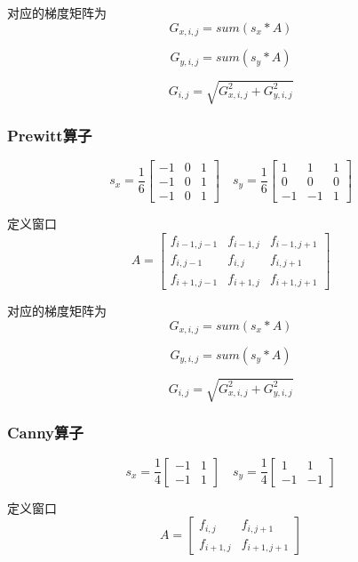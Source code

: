 \documentclass{article}
\begin{document}
对应的梯度矩阵为
\[
G_{x, i,j} = sum\left( s_x * A \right)
\]

\[G_{y, i,j} = sum\left( s_y * A \right)
\]

\[G_{i,j} = \sqrt{G_{x, i,j}^2 + G_{y, i,j}^2}\]

\subsubsection{Prewitt算子}

\[
s_x =
\frac{1}{6}\begin{bmatrix}-1 & 0 & 1\\ -1 & 0 & 1 \\ -1 & 0 & 1
\end{bmatrix}
\quad
s_y =
\frac{1}{6}\begin{bmatrix}1 & 1 & 1 \\ 0 & 0 & 0 \\ -1 & -1 & 1
\end{bmatrix}
\]

定义窗口
\[A = \begin{bmatrix}f_{i - 1, j - 1} & f_{i - 1, j} & f_{i - 1, j + 1} \\f_{i, j - 1} & f_{i,j} & f_{i, j + 1} \\ f_{i + 1, j - 1} & f_{i + 1, j} & f_{i + 1, j + 1}
\end{bmatrix}\]

对应的梯度矩阵为
\[
G_{x, i,j} = sum\left( s_x * A \right)
\]

\[G_{y, i,j} = sum\left( s_y * A \right)
\]

\[G_{i,j} = \sqrt{G_{x, i,j}^2 + G_{y, i,j}^2}\]

\subsubsection{Canny算子}

\[
s_x =
\frac{1}{4}
\begin{bmatrix}-1 & 1 \\ -1 & 1
\end{bmatrix}
\quad
s_y =
\frac{1}{4}
\begin{bmatrix}1 & 1 \\ -1 & -1
\end{bmatrix}
\]

定义窗口\[A = \begin{bmatrix}f_{i,j} & f_{i, j + 1} \\ f_{i + 1, j} & f_{i + 1, j + 1}
\end{bmatrix}\]
\end{document}
